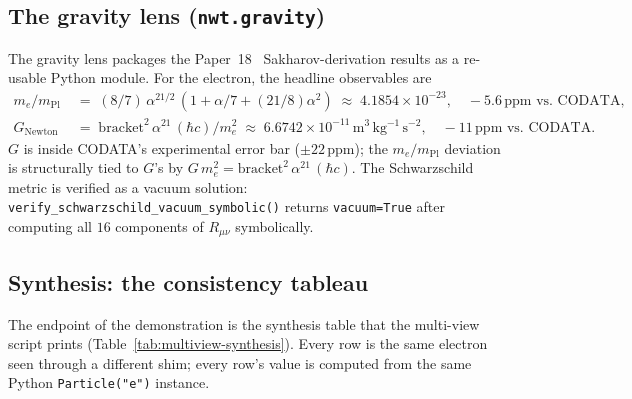 \documentclass[11pt]{article}
\newcommand{\mPl}{m_{\mathrm{Pl}}}
\newcommand{\me}{m_e}
\begin{document}
\subsection{The gravity lens (\texttt{nwt.gravity})}
\label{sec:multiview-gravity}

The gravity lens packages the Paper~18~\cite{paper18}
Sakharov-derivation results as a re-usable Python module.  For the
electron, the headline observables are
\begin{align}
  \me / \mPl
  &\;=\; (8/7)\,\alpha^{21/2}\,(1 + \alpha/7 + (21/8)\alpha^2)
   \;\approx\; 4.1854 \times 10^{-23},
   \quad -5.6\,\text{ppm vs.\ CODATA}, \\
  G_{\mathrm{Newton}}
  &\;=\; \mathrm{bracket}^2\,\alpha^{21}\,(\hbar c)/\me^2
   \;\approx\; 6.6742\times 10^{-11}\,\mathrm{m^3\,kg^{-1}\,s^{-2}},
   \quad -11\,\text{ppm vs.\ CODATA}.
\end{align}
$G$ is inside CODATA's experimental error bar
($\pm 22$\,ppm); the $\me/\mPl$ deviation is structurally tied to
$G$'s by $G\,\me^2 = \mathrm{bracket}^2\,\alpha^{21}\,(\hbar c)$.
The Schwarzschild
metric is verified as a vacuum solution:
\texttt{verify\_schwarzschild\_vacuum\_symbolic()} returns
\texttt{vacuum=True} after computing all $16$ components of
$R_{\mu\nu}$ symbolically.

\subsection{Synthesis: the consistency tableau}
\label{sec:multiview-synthesis}

The endpoint of the demonstration is the synthesis table that the
multi-view script prints (Table~\ref{tab:multiview-synthesis}).
Every row is the same electron seen through a different shim;
every row's value is computed from the same Python
\texttt{Particle("e")} instance.
\end{document}
